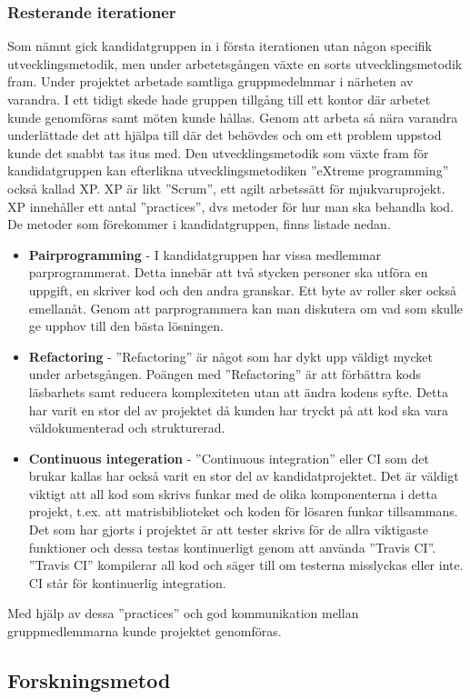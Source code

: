 \subsubsection{Resterande iterationer}
Som nämnt gick kandidatgruppen in i första iterationen utan någon specifik utvecklingsmetodik, men under arbetetsgången växte en sorts utvecklingsmetodik fram.
\newline
\newline
Under projektet arbetade samtliga gruppmedelmmar i närheten av varandra. I ett tidigt skede hade gruppen tillgång till ett kontor där arbetet kunde genomföras samt möten kunde hållas. Genom att arbeta så nära varandra underlättade det att hjälpa till där det behövdes och om ett problem uppstod kunde det snabbt tas itus med.
\newline
\newline
Den utvecklingsmetodik som växte fram för kandidatgruppen kan efterlikna utvecklingsmetodiken ''eXtreme programming'' också kallad XP. XP är likt ''Scrum'', ett agilt arbetssätt för mjukvaruprojekt. XP innehåller ett antal ''practices'', dvs metoder för hur man ska behandla kod. De metoder som förekommer i kandidatgruppen, finns listade nedan.
\begin{itemize}
  \item \textbf{Pairprogramming} - I kandidatgruppen har vissa medlemmar parprogrammerat. Detta innebär att två stycken personer ska utföra en uppgift, en skriver kod och den andra granskar. Ett byte av roller sker också emellanåt. Genom att parprogrammera kan man diskutera om vad som skulle ge upphov till den bästa lösningen.
  \item \textbf{Refactoring} - ''Refactoring'' är något som har dykt upp väldigt mycket under arbetsgången. Poängen med ''Refactoring'' är att förbättra kods läsbarhets samt reducera komplexiteten utan att ändra kodens syfte. Detta har varit en stor del av projektet då kunden har tryckt på att kod ska vara väldokumenterad och strukturerad.
  \item \textbf{Continuous integeration} - ''Continuous integration'' eller CI som det brukar kallas har också varit en stor del av kandidatprojektet. Det är väldigt viktigt att all kod som skrivs funkar med de olika komponenterna i detta projekt, t.ex. att matrisbiblioteket och koden för lösaren funkar tillsammans. Det som har gjorts i projektet är att tester skrivs för de allra viktigaste funktioner och dessa testas kontinuerligt genom att använda ''Travis CI''. ''Travis CI'' kompilerar all kod och säger till om testerna misslyckas eller inte. CI står för kontinuerlig integration.
\end{itemize}
Med hjälp av dessa ''practices'' och god kommunikation mellan gruppmedlemmarna kunde projektet genomföras. 

\subsection{Forskningsmetod}


